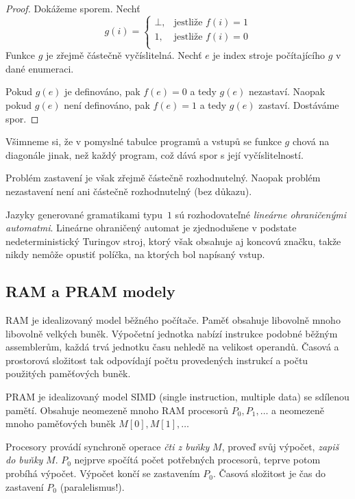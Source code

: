 \begin{proof}
Dokážeme sporem. Nechť
\[
    g(i) =
    \begin{cases}
        \bot, & \text{jestliže } f(i) = 1 \\
        1, & \text{jestliže } f(i) = 0 \\
    \end{cases}
\]
Funkce $g$ je zřejmě částečně vyčíslitelná. Nechť $e$ je index stroje
počítajícího $g$ v dané enumeraci.

Pokud $g(e)$ je definováno, pak $f(e) = 0$ a tedy $g(e)$ nezastaví. Naopak
pokud $g(e)$ není definováno, pak $f(e) = 1$ a tedy $g(e)$ zastaví.
Dostáváme spor.
\end{proof}

Všimneme si, že v pomyslné tabulce programů a vstupů se funkce $g$ chová
na diagonále jinak, než každý program, což dává spor s její
vyčíslitelností.

Problém zastavení je však zřejmě částečně rozhodnutelný.
Naopak problém nezastavení není ani částečně rozhodnutelný (bez důkazu).

Jazyky generované gramatikami typu~$1$ sú rozhodovateľné {\em lineárne
ohraničenými automatmi}. Lineárne ohraničený automat je zjednodušene
v podstate nedeterministický Turingov stroj, ktorý však obsahuje aj 
koncovú značku, takže nikdy nemôže opustiť políčka, na ktorých bol
napísaný vstup.

\subsection{RAM a PRAM modely}


RAM je idealizovaný model běžného počítače. Paměť obsahuje libovolně
mnoho libovolně velkých buněk. Výpočetní jednotka nabízí
instrukce podobné běžným assemblerům, každá trvá jednotku času nehledě
na velikost operandů. Časová a prostorová složitost tak odpovídají počtu
provedených instrukcí a počtu použitých paměťových buněk.

PRAM je idealizovaný model SIMD (single instruction, multiple data) se
sdílenou pamětí. Obsahuje
neomezeně mnoho RAM procesorů $P_0, P_1,\ldots$
a neomezeně mnoho paměťových buněk $M[0], M[1],\ldots$

Procesory provádí synchroně operace {\em čti z buňky} $M$, proveď svůj
výpočet, {\em zapiš do buňky} $M$.
$P_0$ nejprve spočítá počet potřebných procesorů, teprve potom probíhá
výpočet. Výpočet končí se zastavením $P_0$. Časová složitost je čas
do zastavení $P_0$ (paralelismus!).

